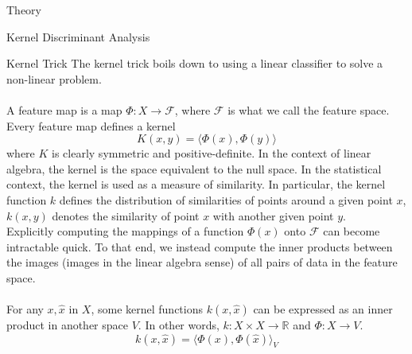 \begin{section}{Theory}
\begin{subsection}{Kernel Discriminant Analysis}
\begin{subsubsection}{Kernel Trick}
The kernel trick boils down to using a linear classifier to solve a non-linear problem.
\\
\\
A feature map is a map $\Phi:X \to \mathcal{F}$, where $\mathcal{F}$ is what we call the feature space. Every feature map defines a kernel
$$
	K(x,y) = \langle \Phi(x), \Phi(y) \rangle
$$
where $K$ is clearly symmetric and positive-definite. In the context of linear algebra, the kernel is the space equivalent to the null space. In the statistical context, the kernel is used as a measure of similarity. In particular, the kernel function $k$ defines the distribution of similarities of points around a given point $x$, $k(x,y)$ denotes the similarity of point $x$ with another given point $y$. 
\\

Explicitly computing the mappings of a function $\Phi(x)$ onto $\mathcal{F}$ can become intractable quick. To that end, we instead compute the inner products between the images (images in the linear algebra sense) of all pairs of data in the feature space.
\\
\\
For any $x, \hat{x}$ in $X$, some kernel functions $k(x,\hat{x})$ can be expressed as an inner product in another space $V$. In other words, $k : X \times X \to \mathbb{R}$ and $\Phi : X \to V$.
$$
	k(x, \hat{x}) = \langle \Phi(x), \Phi( \hat{x} ) \rangle_V
$$
\end{subsubsection}


\end{subsection}
\end{section}
